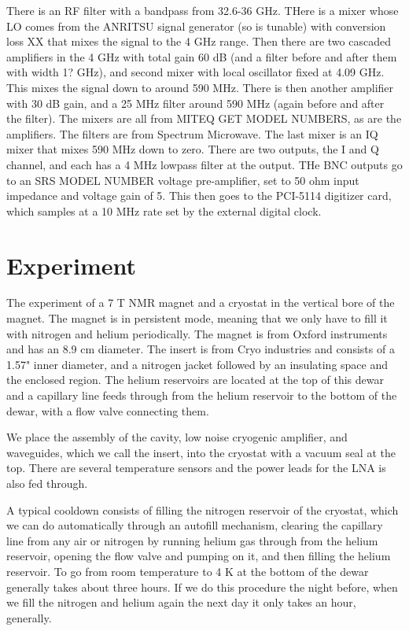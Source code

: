 \documentclass[11pt]{article}
\begin{document}
There is an RF filter with a bandpass from 32.6-36 GHz. THere is a mixer whose LO comes from the ANRITSU signal generator (so is tunable) with conversion loss XX that mixes the signal to the 4 GHz range. Then there are two cascaded amplifiers in the 4 GHz with total gain 60 dB (and a filter before and after them with width 1? GHz), and second mixer with local oscillator fixed at 4.09 GHz. This mixes the signal down to around 590 MHz. There is then another amplifier with 30 dB gain, and a 25 MHz filter around 590 MHz (again before and after the filter). The mixers are all from MITEQ GET MODEL NUMBERS, as are the amplifiers. The filters are from Spectrum Microwave. The last mixer is an IQ mixer that mixes 590 MHz down to zero. There are two outputs, the I and Q channel, and each has a 4 MHz lowpass filter at the output. THe BNC outputs go to an SRS MODEL NUMBER voltage pre-amplifier, set to 50 ohm input impedance and voltage gain of 5. This then goes to the PCI-5114 digitizer card, which samples at a 10 MHz rate set by the external digital clock.



\section{Experiment}

The experiment of a 7 T NMR magnet and a cryostat in the vertical bore of the magnet. The magnet is in persistent mode, meaning that we only have to fill it with nitrogen and helium periodically. The magnet is from Oxford instruments and has an 8.9 cm diameter. The insert is from Cryo industries and consists of a 1.57" inner diameter, and a nitrogen jacket followed by an insulating space and the enclosed region. The helium reservoirs are located at the top of this dewar and a capillary line feeds through from the helium reservoir to the bottom of the dewar, with a flow valve connecting them.

We place the assembly of the cavity, low noise cryogenic amplifier, and waveguides, which we call the insert, into the cryostat with a vacuum seal at the top. There are several temperature sensors and the power leads for the LNA is also fed through.

A typical cooldown consists of filling the nitrogen reservoir of the cryostat, which we can do automatically through an autofill mechanism, clearing the capillary line from any air or nitrogen by running helium gas through from the helium reservoir, opening the flow valve and pumping on it, and then filling the helium reservoir. To go from room temperature to 4 K at the bottom of the dewar generally takes about three hours. If we do this procedure the night before, when we fill the nitrogen and helium again the next day it only takes an hour, generally.
\end{document}
